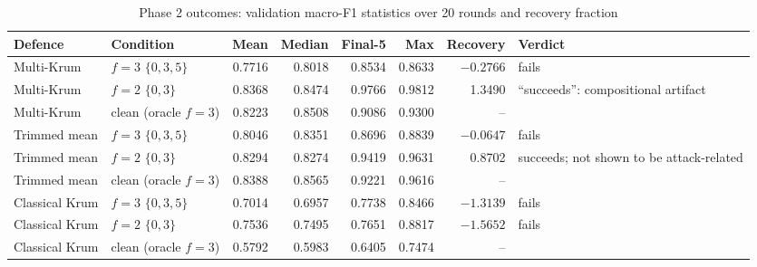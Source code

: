 \begin{table}[t]
\centering
\caption{Phase 2 outcomes: validation macro-F1 statistics over 20 rounds and recovery fraction} %
\label{tab:phase2}
\footnotesize
\begin{tabular}{@{}llrrrrrl@{}}
\toprule
Defence & Condition & Mean & Median & Final-5 & Max & Recovery & Verdict\\ %
\midrule
Multi-Krum & $f=3$ $\{0,3,5\}$ & 0.7716 & 0.8018 & 0.8534 & 0.8633 & $-0.2766$ & fails\\ %
Multi-Krum & $f=2$ $\{0,3\}$ & 0.8368 & 0.8474 & 0.9766 & 0.9812 & 1.3490 & ``succeeds'': compositional artifact\\ %
Multi-Krum & clean (oracle $f=3$) & 0.8223 & 0.8508 & 0.9086 & 0.9300 & -- & \\ %
Trimmed mean & $f=3$ $\{0,3,5\}$ & 0.8046 & 0.8351 & 0.8696 & 0.8839 & $-0.0647$ & fails\\ %
Trimmed mean & $f=2$ $\{0,3\}$ & 0.8294 & 0.8274 & 0.9419 & 0.9631 & 0.8702 & succeeds; not shown to be attack-related\\ %
Trimmed mean & clean (oracle $f=3$) & 0.8388 & 0.8565 & 0.9221 & 0.9616 & -- & \\ %
Classical Krum & $f=3$ $\{0,3,5\}$ & 0.7014 & 0.6957 & 0.7738 & 0.8466 & $-1.3139$ & fails\\ %
Classical Krum & $f=2$ $\{0,3\}$ & 0.7536 & 0.7495 & 0.7651 & 0.8817 & $-1.5652$ & fails\\ %
Classical Krum & clean (oracle $f=3$) & 0.5792 & 0.5983 & 0.6405 & 0.7474 & -- & \\ %
\bottomrule
\end{tabular}
\end{table}

